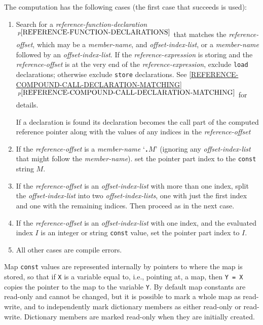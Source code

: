\documentclass[12pt]{article}
\newcommand{\TT}[1]{{\tt \bfseries #1}}
\newcommand{\itemref}[1]{\ref{#1}$\,^{p\pageref{#1}}$}
\newcommand{\pagnote}[1]{$\,^{p\pageref{#1}}$}
\begin{document}
The computation has the following cases (the first case that
succeeds is used):\label{COMPILE-TIME-FIELD-SELECTION}
\begin{enumerate}[resume]
\item\label{COMPILE-TIME-REFERENCE-COMPOUND-CASE}
Search for a {\em reference-function-declaration}%
\pagnote{REFERENCE-FUNCTION-DECLARATIONS} that matches
the {\em reference-offset}, which may be a {\em member-name},
and {\em offset-index-list}, or a {\em member-name} followed by an
{\em offset-index-list}.
If the {\em reference-expression} is storing
and the {\em reference-offset} is at the very end of the
{\em reference-expression}, exclude {\tt load} declarations;
otherwise exclude {\tt store} declarations.
See
\itemref{REFERENCE-COMPOUND-CALL-DECLARATION-MATCHING} for details.

If a declaration is found its declaration becomes the call part of the
computed reference pointer along with the values of any indices
in the {\em reference-offset}

\item If the {\em reference-offset} is a {\em member-name} `\TT{.}$M$'
(ignoring any {\em offset-index-list} that might follow the
{\em member-name}).
set the pointer part index to the {\tt const} string $M$.
\item If the {\em reference-offset} is an {\em offset-index-list} with more than
one index, split the {\em offset-index-list} into two
{\em offset-index-lists}, one with just the first index and one with
the remaining indices.  Then proceed as in the next case.
\item If the {\em reference-offset} is an {\em offset-index-list} with one
index, and the evaluated index $I$ is an integer or string {\tt const} value,
set the pointer part index to $I$.
\item All other cases are compile errors.
\end{enumerate}

Map {\tt const} values are represented internally by pointers to where
the map is stored, so that if {\tt X} is a variable equal to,
i.e., pointing at, a map, then {\tt Y = X} copies the pointer
to the map to the variable {\tt Y}.  By default map constants
are read-only and cannot be changed, but it is possible to mark
a whole map as read-write, and to independently mark dictionary members
as either read-only or read-write.
Dictionary members are marked read-only when they are initially created.
\end{document}
